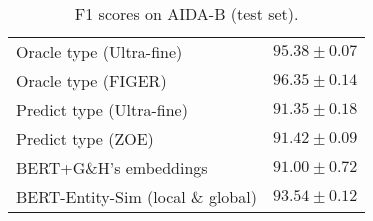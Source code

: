 \documentclass[letterpaper]{article} \usepackage{aaai20}  \usepackage{times}  \usepackage{helvet} \usepackage{courier}  \usepackage[hyphens]{url}  \usepackage{graphicx} \urlstyle{rm} \def\UrlFont{\rm}  \usepackage{graphicx}  \frenchspacing  \setlength{\pdfpagewidth}{8.5in}  \setlength{\pdfpageheight}{11in}  \usepackage{multirow}
\begin{document}
\begin{table}[!t]
{\begin{tabular}{lc}
            Oracle type (Ultra-fine) & $95.38 \pm 0.07 $\\
            Oracle type (FIGER) & $96.35 \pm 0.14$ \\
            Predict type (Ultra-fine) & $91.35 \pm 0.18$\\
            Predict type (ZOE) & $91.42 \pm 0.09$\\
            \hline
            BERT+G\&H's embeddings & $91.00 \pm 0.72$\\
            BERT-Entity-Sim (local \& global) & $\mathbf{93.54} \pm 0.12$ \\
            \hline
        \end{tabular}}
        \caption{F1 scores on AIDA-B (test set).}
        \label{tab:in-domain test}
    \end{table}
\end{document}
